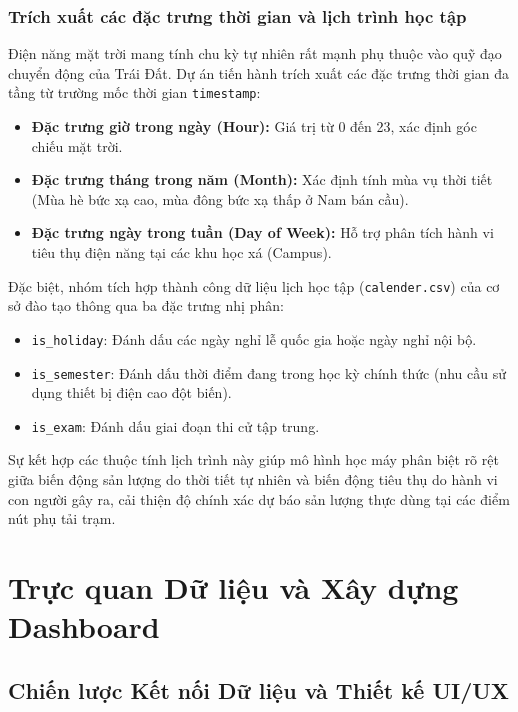 \documentclass[12pt, a4paper]{report}
\begin{document}
\subsection{Trích xuất các đặc trưng thời gian và lịch trình học tập}
Điện năng mặt trời mang tính chu kỳ tự nhiên rất mạnh phụ thuộc vào quỹ đạo chuyển động của Trái Đất. Dự án tiến hành trích xuất các đặc trưng thời gian đa tầng từ trường mốc thời gian \texttt{timestamp}:
\begin{itemize}
    \item \textbf{Đặc trưng giờ trong ngày (Hour):} Giá trị từ 0 đến 23, xác định góc chiếu mặt trời.
    \item \textbf{Đặc trưng tháng trong năm (Month):} Xác định tính mùa vụ thời tiết (Mùa hè bức xạ cao, mùa đông bức xạ thấp ở Nam bán cầu).
    \item \textbf{Đặc trưng ngày trong tuần (Day of Week):} Hỗ trợ phân tích hành vi tiêu thụ điện năng tại các khu học xá (Campus).
\end{itemize}

Đặc biệt, nhóm tích hợp thành công dữ liệu lịch học tập (\texttt{calender.csv}) của cơ sở đào tạo thông qua ba đặc trưng nhị phân:
\begin{itemize}
    \item \texttt{is\_holiday}: Đánh dấu các ngày nghỉ lễ quốc gia hoặc ngày nghỉ nội bộ.
    \item \texttt{is\_semester}: Đánh dấu thời điểm đang trong học kỳ chính thức (nhu cầu sử dụng thiết bị điện cao đột biến).
    \item \texttt{is\_exam}: Đánh dấu giai đoạn thi cử tập trung.
\end{itemize}
Sự kết hợp các thuộc tính lịch trình này giúp mô hình học máy phân biệt rõ rệt giữa biến động sản lượng do thời tiết tự nhiên và biến động tiêu thụ do hành vi con người gây ra, cải thiện độ chính xác dự báo sản lượng thực dùng tại các điểm nút phụ tải trạm.


\chapter{Trực quan Dữ liệu và Xây dựng Dashboard}
\label{chap:dashboard}

\section{Chiến lược Kết nối Dữ liệu và Thiết kế UI/UX}
\label{sec:dashboard_strategy}
\end{document}
